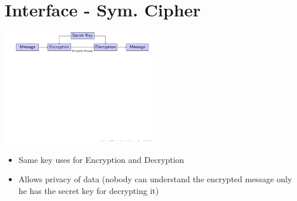 \section{Interface - Sym. Cipher}

\begin{frame}


\includegraphics[trim=0.5cm 4cm 14cm 0cm, height=5cm]{figures/sym_cipher.pdf}


\begin{itemize}
  \item Same key uses for Encryption and Decryption
  \item Allows privacy of data (nobody can understand the encrypted message
  only he has the secret key for decrypting it)
\end{itemize}



\end{frame}
